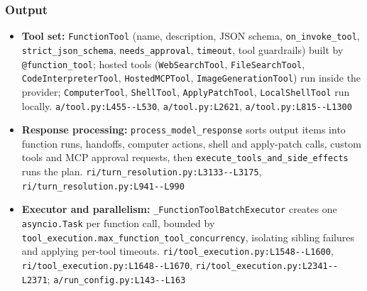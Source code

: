 \subsubsection*{Output}
\begin{itemize}
\item \textbf{Tool set:} \texttt{FunctionTool} (name, description, JSON schema, \texttt{on\_\allowbreak{}invoke\_\allowbreak{}tool}, \texttt{strict\_\allowbreak{}json\_\allowbreak{}schema}, \texttt{needs\_\allowbreak{}approval}, \texttt{timeout}, tool guardrails) built by \texttt{@function\_\allowbreak{}tool}; hosted tools (\texttt{WebSearchTool}, \texttt{FileSearchTool}, \texttt{CodeInterpreterTool}, \texttt{HostedMCPTool}, \texttt{ImageGenerationTool}) run inside the provider; \texttt{ComputerTool}, \texttt{ShellTool}, \texttt{ApplyPatchTool}, \texttt{LocalShellTool} run locally. \texttt{a/\allowbreak{}tool.\allowbreak{}py:\allowbreak{}L455-\allowbreak{}-\allowbreak{}L530}, \texttt{a/\allowbreak{}tool.\allowbreak{}py:\allowbreak{}L2621}, \texttt{a/\allowbreak{}tool.\allowbreak{}py:\allowbreak{}L815-\allowbreak{}-\allowbreak{}L1300}
\item \textbf{Response processing:} \texttt{process\_\allowbreak{}model\_\allowbreak{}response} sorts output items into function runs, handoffs, computer actions, shell and apply-patch calls, custom tools and MCP approval requests, then \texttt{execute\_\allowbreak{}tools\_\allowbreak{}and\_\allowbreak{}side\_\allowbreak{}effects} runs the plan. \texttt{ri/\allowbreak{}turn\_\allowbreak{}resolution.\allowbreak{}py:\allowbreak{}L3133-\allowbreak{}-\allowbreak{}L3175}, \texttt{ri/\allowbreak{}turn\_\allowbreak{}resolution.\allowbreak{}py:\allowbreak{}L941-\allowbreak{}-\allowbreak{}L990}
\item \textbf{Executor and parallelism:} \texttt{\_\allowbreak{}FunctionToolBatchExecutor} creates one \texttt{asyncio.\allowbreak{}Task} per function call, bounded by \texttt{tool\_\allowbreak{}execution.\allowbreak{}max\_\allowbreak{}function\_\allowbreak{}tool\_\allowbreak{}concurrency}, isolating sibling failures and applying per-tool timeouts. \texttt{ri/\allowbreak{}tool\_\allowbreak{}execution.\allowbreak{}py:\allowbreak{}L1548-\allowbreak{}-\allowbreak{}L1600}, \texttt{ri/\allowbreak{}tool\_\allowbreak{}execution.\allowbreak{}py:\allowbreak{}L1648-\allowbreak{}-\allowbreak{}L1670}, \texttt{ri/\allowbreak{}tool\_\allowbreak{}execution.\allowbreak{}py:\allowbreak{}L2341-\allowbreak{}-\allowbreak{}L2371}; \texttt{a/\allowbreak{}run\_\allowbreak{}config.\allowbreak{}py:\allowbreak{}L143-\allowbreak{}-\allowbreak{}L163}

\end{itemize}
